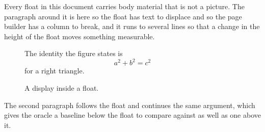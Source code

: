 \documentclass{article}
\begin{document}
Every float in this document carries body material that is not a
picture. The paragraph around it is here so the float has text to displace and
so the page builder has a column to break, and it runs to several lines so that
a change in the height of the float moves something measurable.

\begin{figure}[h]
\centering
The identity the figure states is
\[ a^2 + b^2 = c^2 \]
for a right triangle.
\caption{A display inside a float.}
\end{figure}

The second paragraph follows the float and continues the same
argument, which gives the oracle a baseline below the float to compare against
as well as one above it.
\end{document}
